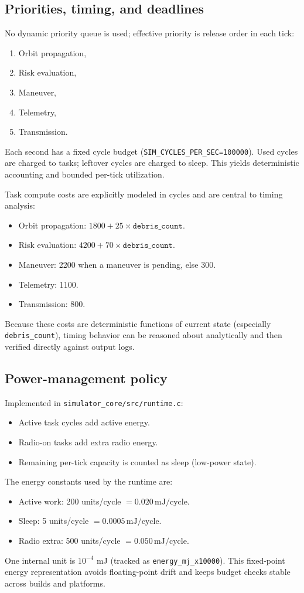 \documentclass[11pt,a4paper]{article}
\begin{document}
\subsection*{Priorities, timing, and deadlines}
No dynamic priority queue is used; effective priority is release order in each tick:
\begin{enumerate}[leftmargin=1.5em]
    \item Orbit propagation,
    \item Risk evaluation,
    \item Maneuver,
    \item Telemetry,
    \item Transmission.
\end{enumerate}
Each second has a fixed cycle budget (\texttt{SIM\_CYCLES\_PER\_SEC=100000}).
Used cycles are charged to tasks; leftover cycles are charged to sleep.
This yields deterministic accounting and bounded per-tick utilization.

Task compute costs are explicitly modeled in cycles and are central to timing analysis:
\begin{itemize}[leftmargin=1.5em]
    \item Orbit propagation: \(1800 + 25 \times \texttt{debris\_count}\).
    \item Risk evaluation: \(4200 + 70 \times \texttt{debris\_count}\).
    \item Maneuver: 2200 when a maneuver is pending, else 300.
    \item Telemetry: 1100.
    \item Transmission: 800.
\end{itemize}
Because these costs are deterministic functions of current state (especially \texttt{debris\_count}), timing behavior can be reasoned about analytically and then verified directly against output logs.

\subsection*{Power-management policy}
Implemented in \texttt{simulator\_core/src/runtime.c}:
\begin{itemize}[leftmargin=1.5em]
    \item Active task cycles add active energy.
    \item Radio-on tasks add extra radio energy.
    \item Remaining per-tick capacity is counted as sleep (low-power state).
\end{itemize}
The energy constants used by the runtime are:
\begin{itemize}[leftmargin=1.5em]
    \item Active work: 200 units/cycle \(=0.020\,\text{mJ/cycle}\).
    \item Sleep: 5 units/cycle \(=0.0005\,\text{mJ/cycle}\).
    \item Radio extra: 500 units/cycle \(=0.050\,\text{mJ/cycle}\).
\end{itemize}
One internal unit is \(10^{-4}\) mJ (tracked as \texttt{energy\_mj\_x10000}).
This fixed-point energy representation avoids floating-point drift and keeps budget checks stable across builds and platforms.
\end{document}
